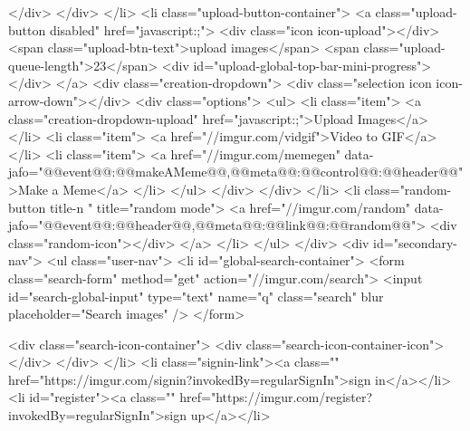                         </div>
                    </div>
                </li>
                <li class="upload-button-container">
                    <a class="upload-button disabled" href="javascript:;">
                        <div class="icon icon-upload"></div>
                        <span class="upload-btn-text">upload images</span>
                        <span class="upload-queue-length">23</span>
                        <div id="upload-global-top-bar-mini-progress"></div>
                    </a>
                    <div class="creation-dropdown">
                        <div class="selection icon icon-arrow-down"></div>
                        <div class="options">
                            <ul>
                                <li class="item">
                                    <a class="creation-dropdown-upload" href="javascript:;">Upload Images</a>
                                </li>
                                <li class="item">
                                    <a href="//imgur.com/vidgif">Video to GIF</a>
                                </li>
                                <li class="item">
                                    <a href="//imgur.com/memegen" data-jafo="{@@event@@:@@makeAMeme@@,@@meta@@:{@@control@@:@@header@@}}">Make a Meme</a>
                                </li>
                            </ul>
                        </div>
                    </div>
                </li>
                <li class="random-button title-n " title="random mode">
                    <a href="//imgur.com/random" data-jafo="{@@event@@:@@header@@,@@meta@@:{@@link@@:@@random@@}}">
                        <div class="random-icon"></div>
                    </a>
                </li>
            </ul>
        </div>
        <div id="secondary-nav">
            <ul class="user-nav">
                <li id="global-search-container">
                    <form class="search-form" method="get" action="//imgur.com/search">
                        <input id="search-global-input" type="text" name="q" class="search" blur placeholder="Search images"  />
                    </form>

                    <div class="search-icon-container">
                        <div class="search-icon-container-icon"></div>
                    </div>
                </li>
                                    <li class="signin-link"><a class="" href="https://imgur.com/signin?invokedBy=regularSignIn">sign in</a></li>
                    <li id="register"><a class="" href="https://imgur.com/register?invokedBy=regularSignIn">sign up</a></li>
                
